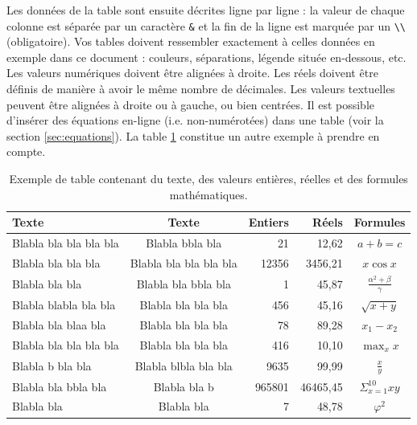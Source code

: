 \documentclass{ceri}
\begin{document}
Les données de la table sont ensuite décrites ligne par ligne : la valeur de chaque colonne est séparée par un caractère \texttt{\&} et la fin de la ligne est marquée par un \texttt{\textbackslash{}\textbackslash{}} (obligatoire).
Vos tables doivent ressembler exactement à celles données en exemple dans ce document : couleurs, séparations, légende située en-dessous, etc. Les valeurs numériques doivent être alignées à droite. Les réels doivent être définis de manière à avoir le même nombre de décimales. Les valeurs textuelles peuvent être alignées à droite ou à gauche, ou bien centrées. Il est possible d'insérer des équations en-ligne (i\@.e\@. non-numérotées) dans une table (voir la section \ref{sec:equations}). La table \ref{tab:exemple} constitue un autre exemple à prendre en compte.
\begin{table}[htb]
	\centering
	\begin{tabular}{l c r r c}
		\hline
		\rowcolor{DarkColor} 
		\textbf{Texte} 			& \textbf{Texte}			& \textbf{Entiers}	& \textbf{Réels}	& \textbf{Formules}	\\ 
		\hline
		Blabla bla bla bla bla	& Blabla bbla bla			& 21 				& 12,62				& $a+b=c$								\\
		Blabla bla bla bla		& Blabla bla bla bla bla	& 12356 			& 3456,21			& $x\cos{x}$							\\
		Blabla bla bla			& Blabla bla bbla bla		& 1 				& 45,87				& $\frac{\alpha^{2}+\beta}{\gamma}$	\\
		Blabla blabla bla bla	& Blabla bla bla bla		& 456 				& 45,16				& $\sqrt{x+y}$	\\
		Blabla bla blaa bla		& Blabla bla bla bla		& 78 				& 89,28				& $x_{1}-x_{2}$	\\
		Blabla bla bla bla bla	& Blabla bla bla bla		& 416 				& 10,10				& $\max_{x}{x}$	\\
		Blabla b bla bla		& Blabla blbla bla bla		& 9635 				& 99,99				& $\frac{x}{y}$	\\
		Blabla bla bbla bla		& Blabla bla b				& 965801 			& 46465,45			& $\Sigma_{x=1}^{10}{xy}$	\\
		Blabla bla				& Blabla bla				& 7 				& 48,78				& $\varphi^2$	\\
		\hline
	\end{tabular}
	\caption{Exemple de table contenant du texte, des valeurs entières, réelles et des formules mathématiques.}
	\label{tab:exemple}
\end{table}
\end{document}
